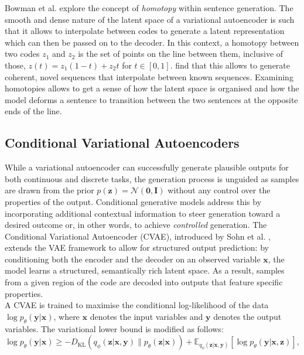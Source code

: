 \documentclass[Main.tex]{subfiles}
\begin{document}
Bowman et al. \cite{bowman_generating_2016} explore the concept of \textit{homotopy} within sentence generation. The smooth and dense nature of the latent space of a variational autoencoder is such that it allows to interpolate between codes to generate a latent representation which can then be passed on to the decoder. In this context, a homotopy between two codes $z_1$ and $z_2$ is the set of points on the line between them, inclusive of those, $z(t) = z_1(1−t)+z_2t$ for $t \in [0,1]$. \cite{bowman_generating_2016} find that this allows to generate coherent, novel sequences that interpolate between known sequences. Examining homotopies allows to get a sense of how the latent space is organised and how the model deforms a sentence to transition between the two sentences at the opposite ends of the line.\\

\subsection{Conditional Variational Autoencoders}
While a variational autoencoder can successfully generate plausible outputs for both continuous and discrete tasks, the generation process is unguided as samples are drawn from the prior $p(\mathbf{z}) = \mathcal{N}(\boldsymbol{0}, \mathbf{I})$ without any control over the properties of the output. Conditional generative models address this by incorporating additional contextual information to steer generation toward a desired outcome or, in other words, to achieve \textit{controlled} generation. The Conditional Variational Autoencoder (CVAE), introduced by Sohn et al. \cite{sohn_learning_2015}, extends the VAE framework to allow for structured output prediction: by conditioning both the encoder and the decoder on an observed variable $\mathbf{x}$, the model learns a structured, semantically rich latent space. As a result, samples from a given region of the code are decoded into outputs that feature specific properties.\\

A CVAE is trained to maximise the conditional log-likelihood of the data $\log p_\theta(\mathbf{y}|\mathbf{x})$, where $\mathbf{x}$ denotes the input variables and $\mathbf{y}$ denotes the output variables. The variational lower bound is modified as follows:
\begin{equation}
\log p_\theta(\mathbf{y}|\mathbf{x}) \geq -D_{\text{KL}}\left(q_\phi(\mathbf{z}|\mathbf{x}, \mathbf{y}) \| p_\theta(\mathbf{z}|\mathbf{x})\right) + \mathbb{E}_{q_\phi(\mathbf{z}|\mathbf{x},\mathbf{y})}\left[\log p_\theta(\mathbf{y}|\mathbf{x}, \mathbf{z})\right],
\end{equation}
\end{document}
